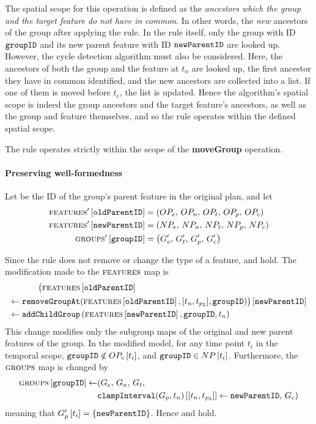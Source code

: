    The spatial scope for this operation is defined as the \emph{ancestors which the group and the target feature do not have in common}. In other words, the \emph{new} ancestors of the group after applying the rule. In the rule itself, only the group with ID $\texttt{groupID}$ and its new parent feature with ID $\texttt{newParentID}$ are looked up. However, the cycle detection algorithm must also be considered. Here, the ancestors of both the group and the feature at $t_n$ are looked up, the first ancestor they have in common identified, and the new ancestors are collected into a list. If one of them is moved before $t_e$, the list is updated. Hence the algorithm's spatial scope is indeed the group ancestors and the target feature's ancestors, as well as the group and feature themselves, and so the rule operates within the defined spatial scope.
\\

\begin{lemma}
   The  rule operates strictly within the scope of the \textbf{moveGroup} operation.
   \label{lemma:move-group-scope}
\end{lemma}

\paragraph{Preserving well-formedness}
Let  be the ID of the group's parent feature in the original plan, and let
\begin{align*}
   \textsc{features}' \left[ \texttt{oldParentID} \right] &= \left(OP_e,\, OP_n,\, OP_t,\, OP_p,\, OP_c\right) \\
   \textsc{features}' \left[ \texttt{newParentID} \right] &= \left(NP_e,\, NP_n,\, NP_t,\, NP_p,\, NP_c\right) \\
   \textsc{groups}{}' \left[ \texttt{groupID} \right] &= \left(G'_e,\, G'_t,\, G'_p,\, G'_c\right)
\end{align*}

Since the  rule does not remove or change the type of a feature,  and  hold. The modification made to the $\textsc{features}{}$ map is 
\begin{align*}
   \lookup{\big(\lookup{\features{}&}{\var{oldParentID}} \\
   \assign  \var{removeGroupAt}& (\lookup{\features{}}{\var{oldParentID}}, \interval{t_n}{t_{p_2}}, \var{groupID})\big)}{\var{newParentID}} \\
   \assign  \var{addChildGroup}& \left(\lookup{\features{}}{\var{newParentID}}, \var{groupID}, t_n\right)
\end{align*}
This change modifies only the subgroup maps of the original and new parent features of the group. In the modified model, for any time point $t_i$ in the temporal scope, $\texttt{groupID} \notin OP_c \left[ t_i \right]$, and $\texttt{groupID} \in NP \left[ t_i \right]$. Furthermore, the $\textsc{groups}{}{}$ map is changed by
\begin{align*}
   \lookup{\groups{}}{\var{groupID}} \assign &(G_e,\, G_n,\, G_t,\, \\
                                             & \lookup{\var{clampInterval}(G_p, t_n)}{\interval{t_n}{t_{p_2}}} \assign \var{newParentID},\, G_c)
\end{align*}
meaning that $G'_p \left[ t_i \right] = \left\{\texttt{newParentID}\right\}$. Hence  and  hold. 

